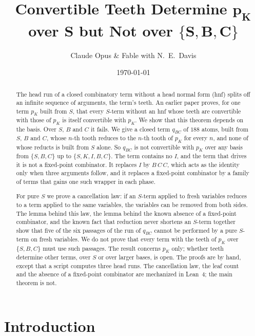\documentclass[11pt]{amsart}
\title[Teeth and the Basis]{Convertible Teeth Determine $\bm{p_K}$ over $\bm{S}$ but Not over $\bm{\{S,B,C\}}$}
\author{Claude Opus \& Fable with N.\ E.\ Davis}
\date{\today}
\theoremstyle{definition}
\begin{document}
\begin{abstract}
The head run of a closed combinatory term without a head normal form (hnf) splits off an infinite
sequence of arguments, the term's teeth. An earlier paper proves, for one term $p_K$ built from $S$,
that every $S$-term without an hnf whose teeth are convertible with those of $p_K$ is itself
convertible with $p_K$. We show that this theorem depends on the basis. Over $S$, $B$ and $C$ it
fails. We give a closed term $q_{BC}$ of $188$ atoms, built from $S$, $B$ and $C$, whose $n$-th tooth
reduces to the $n$-th tooth of $p_K$ for every $n$, and none of whose reducts is built from $S$ alone.
So $q_{BC}$ is not convertible with $p_K$ over any basis from $\{S,B,C\}$ up to $\{S,K,I,B,C\}$. The
term contains no $I$, and the term that drives it is not a fixed-point combinator. It replaces $I$ by
$B\,C\,C$, which acts as the identity only when three arguments follow, and it replaces a fixed-point
combinator by a family of terms that gains one such wrapper in each phase.

For pure $S$ we prove a cancellation law: if an $S$-term applied to fresh variables reduces to a term
applied to the same variables, the variables can be removed from both sides. The lemma behind this
law, the lemma behind the known absence of a fixed-point combinator, and the known fact that
reduction never shortens an $S$-term together show that five of the six passages of the run of
$q_{BC}$ cannot be performed by a pure $S$-term on fresh variables. We do not prove that every term
with the teeth of $p_K$ over $\{S,B,C\}$ must use such passages. The result concerns $p_K$ only;
whether teeth determine other terms, over $S$ or over larger bases, is open. The proofs are by hand,
except that a script computes three head runs. The cancellation law, the leaf count and the absence
of a fixed-point combinator are mechanized in Lean~4; the main theorem is not.
\end{abstract}

\maketitle

\section{Introduction}
\end{document}

